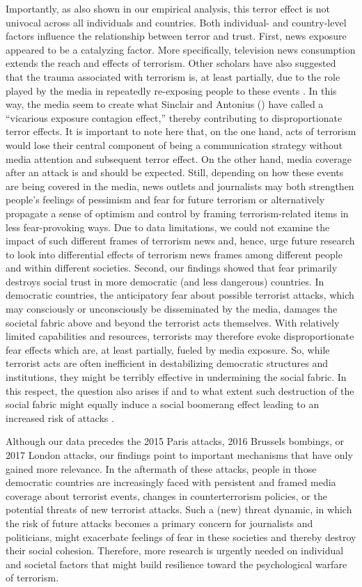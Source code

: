 Importantly, as also shown in our empirical analysis, this terror effect is not univocal across all individuals and countries. Both individual- and country-level factors influence the relationship between terror and trust. First, news exposure appeared to be a catalyzing factor. More specifically, television news consumption extends the reach and effects of terrorism. Other scholars have also suggested that the trauma associated with terrorism is, at least partially, due to the role played by the media in repeatedly re-exposing people to these events \citep{Marshall2007}. In this way, the media seem to create what Sinclair and Antonius (\citeyear[][p.43]{Sinclair2012}) have called a ``vicarious exposure contagion effect,'' thereby contributing to disproportionate terror effects. It is important to note here that, on the one hand, acts of terrorism would lose their central component of being a communication strategy without media attention and subsequent terror effect. On the other hand, media coverage after an attack is and should be expected. Still, depending on how these events are being covered in the media, news outlets and journalists may both strengthen people’s feelings of pessimism and fear for future terrorism or alternatively propagate a sense of optimism and control by framing terrorism-related items in less fear-provoking ways. Due to data limitations, we could not examine the impact of such different frames of terrorism news and, hence, urge future research to look into differential effects of terrorism news frames among different people and within different societies. Second, our findings showed that fear primarily destroys social trust in more democratic (and less dangerous) countries. In democratic countries, the anticipatory fear about possible terrorist attacks, which may consciously or unconsciously be disseminated by the media, damages the societal fabric above and beyond the terrorist acts themselves. With relatively limited capabilities and resources, terrorists may therefore evoke disproportionate fear effects which are, at least partially, fueled by media exposure. So, while terrorist acts are often inefficient in destabilizing democratic structures and institutions, they might be terribly effective in undermining the social fabric. In this respect, the question also arises if
and to what extent such destruction of the social fabric might equally induce a social boomerang effect leading to an increased risk of attacks \citep{Hosking2009}.


Although our data precedes the 2015 Paris attacks, 2016 Brussels bombings, or 2017 London attacks, our findings point to important mechanisms that have only gained more relevance. In the aftermath of these attacks, people in those democratic countries are increasingly faced with persistent and framed media coverage about terrorist events, changes in counterterrorism policies, or the potential threats of new terrorist attacks. Such a (new) threat dynamic, in which the risk of future attacks becomes a primary concern for journalists and politicians, might exacerbate feelings of fear in these societies and thereby destroy their social cohesion. Therefore, more research is urgently needed on individual and societal factors that might build resilience toward the psychological warfare of terrorism.


\cleardoublepage
